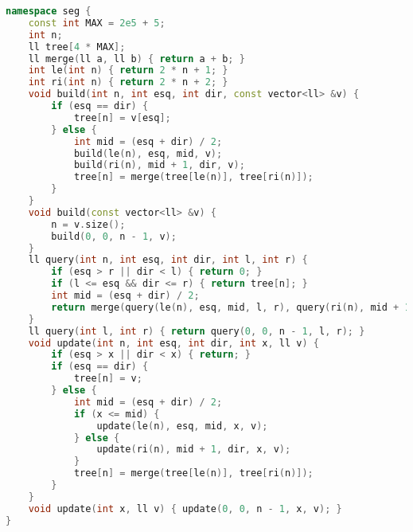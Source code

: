 \documentclass[11pt, a4paper, twoside]{article}
\begin{document}
\begin{lstlisting}[language=C++]
namespace seg {
    const int MAX = 2e5 + 5;
    int n;
    ll tree[4 * MAX];
    ll merge(ll a, ll b) { return a + b; }
    int le(int n) { return 2 * n + 1; }
    int ri(int n) { return 2 * n + 2; }
    void build(int n, int esq, int dir, const vector<ll> &v) {
        if (esq == dir) {
            tree[n] = v[esq];
        } else {
            int mid = (esq + dir) / 2;
            build(le(n), esq, mid, v);
            build(ri(n), mid + 1, dir, v);
            tree[n] = merge(tree[le(n)], tree[ri(n)]);
        }
    }
    void build(const vector<ll> &v) {
        n = v.size();
        build(0, 0, n - 1, v);
    }
    ll query(int n, int esq, int dir, int l, int r) {
        if (esq > r || dir < l) { return 0; }
        if (l <= esq && dir <= r) { return tree[n]; }
        int mid = (esq + dir) / 2;
        return merge(query(le(n), esq, mid, l, r), query(ri(n), mid + 1, dir, l, r));
    }
    ll query(int l, int r) { return query(0, 0, n - 1, l, r); }
    void update(int n, int esq, int dir, int x, ll v) {
        if (esq > x || dir < x) { return; }
        if (esq == dir) {
            tree[n] = v;
        } else {
            int mid = (esq + dir) / 2;
            if (x <= mid) {
                update(le(n), esq, mid, x, v);
            } else {
                update(ri(n), mid + 1, dir, x, v);
            }
            tree[n] = merge(tree[le(n)], tree[ri(n)]);
        }
    }
    void update(int x, ll v) { update(0, 0, n - 1, x, v); }
}
\end{lstlisting}
\end{document}
